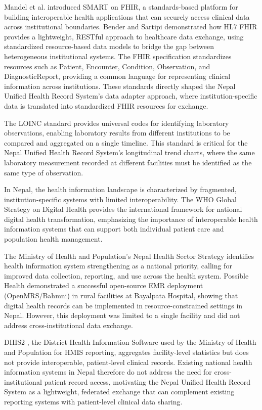 \documentclass[12pt]{report}
\numberwithin{equation}{chapter}
\begin{document}
Mandel et al. \cite{mandel} introduced SMART on FHIR, a standards-based platform for building interoperable health applications that can securely access clinical data across institutional boundaries. Bender and Sartipi \cite{bender} demonstrated how HL7 FHIR provides a lightweight, RESTful approach to healthcare data exchange, using standardized resource-based data models to bridge the gap between heterogeneous institutional systems. The FHIR specification \cite{hl7spec} standardizes resources such as Patient, Encounter, Condition, Observation, and DiagnosticReport, providing a common language for representing clinical information across institutions. These standards directly shaped the Nepal Unified Health Record System's data adapter approach, where institution-specific data is translated into standardized FHIR resources for exchange.

The LOINC standard \cite{loinc} provides universal codes for identifying laboratory observations, enabling laboratory results from different institutions to be compared and aggregated on a single timeline. This standard is critical for the Nepal Unified Health Record System's longitudinal trend charts, where the same laboratory measurement recorded at different facilities must be identified as the same type of observation.

In Nepal, the health information landscape is characterized by fragmented, institution-specific systems with limited interoperability. The WHO Global Strategy on Digital Health \cite{who} provides the international framework for national digital health transformation, emphasizing the importance of interoperable health information systems that can support both individual patient care and population health management.

The Ministry of Health and Population's Nepal Health Sector Strategy \cite{mohp} identifies health information system strengthening as a national priority, calling for improved data collection, reporting, and use across the health system. Possible Health \cite{possible} demonstrated a successful open-source EMR deployment (OpenMRS/Bahmni) in rural facilities at Bayalpata Hospital, showing that digital health records can be implemented in resource-constrained settings in Nepal. However, this deployment was limited to a single facility and did not address cross-institutional data exchange.

DHIS2 \cite{dhis2}, the District Health Information Software used by the Ministry of Health and Population for HMIS reporting, aggregates facility-level statistics but does not provide interoperable, patient-level clinical records. Existing national health information systems in Nepal therefore do not address the need for cross-institutional patient record access, motivating the Nepal Unified Health Record System as a lightweight, federated exchange that can complement existing reporting systems with patient-level clinical data sharing.
\end{document}
